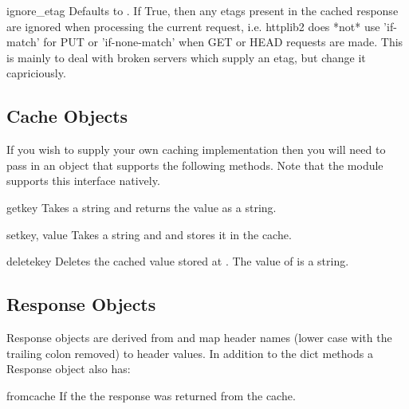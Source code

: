 \begin{memberdesc}[Http]{ignore_etag}
Defaults to . If True, then any etags present in the cached response
are ignored when processing the current request, i.e. httplib2 does *not* use
'if-match' for PUT or 'if-none-match' when GET or HEAD requests are made. This
is mainly to deal with broken servers which supply an etag, but change it capriciously.
\end{memberdesc}

\subsection{Cache Objects}
\label{cache-objects}

If you wish to supply your own caching implementation
then you will need to pass in an object that supports the 
following methods. Note that the  module
supports this interface natively.

\begin{methoddesc}[Cache]{get}{key}
Takes a string  and returns the value as a string.
\end{methoddesc}

\begin{methoddesc}[Cache]{set}{key, value}
Takes a string  and  and stores it in the cache.
\end{methoddesc}

\begin{methoddesc}[Cache]{delete}{key}
Deletes the cached value stored at . The value
of  is a string.
\end{methoddesc}





\subsection{Response Objects}
\label{response-objects}

Response objects are derived from  and map
header names (lower case with the trailing colon removed)
to header values. In addition to the dict methods
a Response object also has:

\begin{memberdesc}[Response]{fromcache}
If  the the response was returned from the cache.
\end{memberdesc}

